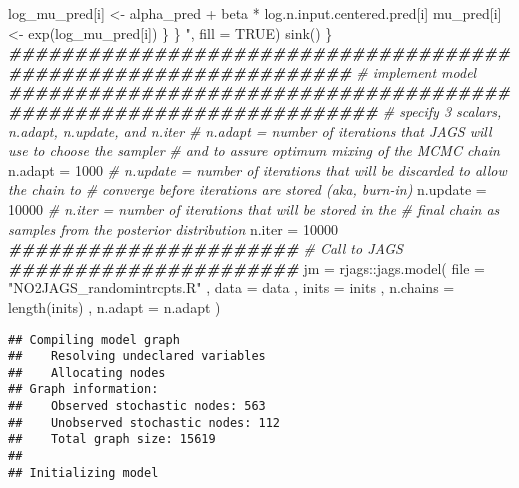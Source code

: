 \documentclass[
]{article}
\newenvironment{Shaded}{\begin{snugshade}}{\end{snugshade}}
\newcommand{\AttributeTok}[1]{\textcolor[rgb]{0.77,0.63,0.00}{#1}}
\newcommand{\CommentTok}[1]{\textcolor[rgb]{0.56,0.35,0.01}{\textit{#1}}}
\newcommand{\ConstantTok}[1]{\textcolor[rgb]{0.00,0.00,0.00}{#1}}
\newcommand{\DecValTok}[1]{\textcolor[rgb]{0.00,0.00,0.81}{#1}}
\newcommand{\DocumentationTok}[1]{\textcolor[rgb]{0.56,0.35,0.01}{\textbf{\textit{#1}}}}
\newcommand{\FunctionTok}[1]{\textcolor[rgb]{0.00,0.00,0.00}{#1}}
\newcommand{\NormalTok}[1]{#1}
\newcommand{\OtherTok}[1]{\textcolor[rgb]{0.56,0.35,0.01}{#1}}
\newcommand{\SpecialCharTok}[1]{\textcolor[rgb]{0.00,0.00,0.00}{#1}}
\newcommand{\StringTok}[1]{\textcolor[rgb]{0.31,0.60,0.02}{#1}}
\begin{document}
\begin{Shaded}
\begin{Highlighting}[]
\StringTok{          log\_mu\_pred[i] \textless{}{-} alpha\_pred + beta * log.n.input.centered.pred[i]}
\StringTok{          mu\_pred[i] \textless{}{-} exp(log\_mu\_pred[i])}
\StringTok{        \}}
\StringTok{  \}}
\StringTok{  "}\NormalTok{, }\AttributeTok{fill =} \ConstantTok{TRUE}\NormalTok{)}
  \FunctionTok{sink}\NormalTok{()}
\NormalTok{\}}
\DocumentationTok{\#\#\#\#\#\#\#\#\#\#\#\#\#\#\#\#\#\#\#\#\#\#\#\#\#\#\#\#\#\#\#\#\#\#\#\#\#\#\#\#\#\#\#\#\#\#\#\#\#\#\#\#\#\#\#\#\#\#\#\#\#\#\#\#}
\CommentTok{\# implement model}
\DocumentationTok{\#\#\#\#\#\#\#\#\#\#\#\#\#\#\#\#\#\#\#\#\#\#\#\#\#\#\#\#\#\#\#\#\#\#\#\#\#\#\#\#\#\#\#\#\#\#\#\#\#\#\#\#\#\#\#\#\#\#\#\#\#\#\#\#\#\#}
\CommentTok{\# specify 3 scalars, n.adapt, n.update, and n.iter}
\CommentTok{\# n.adapt = number of iterations that JAGS will use to choose the sampler }
  \CommentTok{\# and to assure optimum mixing of the MCMC chain}
\NormalTok{n.adapt }\OtherTok{=} \DecValTok{1000}
\CommentTok{\# n.update = number of iterations that will be discarded to allow the chain to }
\CommentTok{\#   converge before iterations are stored (aka, burn{-}in)}
\NormalTok{n.update }\OtherTok{=} \DecValTok{10000}
\CommentTok{\# n.iter = number of iterations that will be stored in the }
  \CommentTok{\# final chain as samples from the posterior distribution}
\NormalTok{n.iter }\OtherTok{=} \DecValTok{10000}
\DocumentationTok{\#\#\#\#\#\#\#\#\#\#\#\#\#\#\#\#\#\#\#\#\#\#}
\CommentTok{\# Call to JAGS}
\DocumentationTok{\#\#\#\#\#\#\#\#\#\#\#\#\#\#\#\#\#\#\#\#\#\#}
\NormalTok{jm }\OtherTok{=}\NormalTok{ rjags}\SpecialCharTok{::}\FunctionTok{jags.model}\NormalTok{(}
  \AttributeTok{file =} \StringTok{"NO2JAGS\_randomintrcpts.R"}
\NormalTok{  , }\AttributeTok{data =}\NormalTok{ data}
\NormalTok{  , }\AttributeTok{inits =}\NormalTok{ inits}
\NormalTok{  , }\AttributeTok{n.chains =} \FunctionTok{length}\NormalTok{(inits)}
\NormalTok{  , }\AttributeTok{n.adapt =}\NormalTok{ n.adapt}
\NormalTok{)}
\end{Highlighting}
\end{Shaded}

\begin{verbatim}
## Compiling model graph
##    Resolving undeclared variables
##    Allocating nodes
## Graph information:
##    Observed stochastic nodes: 563
##    Unobserved stochastic nodes: 112
##    Total graph size: 15619
## 
## Initializing model
\end{verbatim}
\end{document}
